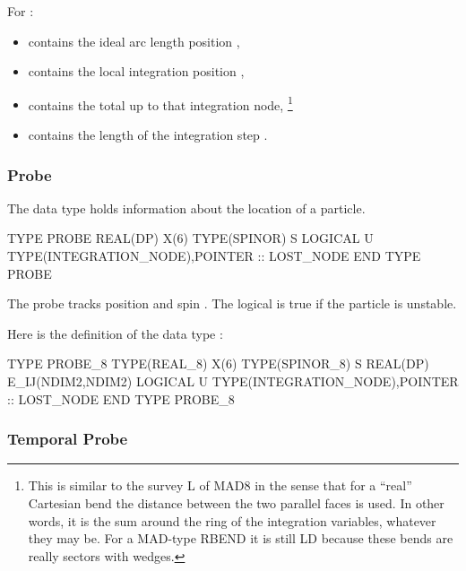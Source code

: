 For :
\begin{itemize}
  \item {} contains the ideal arc length position ,
  \item {} contains the local integration position ,
  \item {} contains the total  up to that integration node,%
  \footnote{This is similar to the survey L of MAD8 in the sense that for a
``real'' Cartesian bend the distance between the two parallel faces is used.
In other words, it is the sum around the ring of the integration variables,
whatever they may be. For a MAD-type RBEND it is still LD because these
bends are really sectors with wedges.}
  \item {} contains the length of the integration step 
  .
\end{itemize}


\subsubsection{Probe}
\label{sub:Probe-B}

The data type  holds information about the location of a particle.

\begin{ptccode}
TYPE PROBE
  REAL(DP) X(6)
  TYPE(SPINOR) S
  LOGICAL U
  TYPE(INTEGRATION_NODE),POINTER :: LOST_NODE
END TYPE PROBE
\end{ptccode}

The probe tracks position  and spin . The logical  is true if the particle is unstable.

Here is the definition of the data type :

\begin{ptccode}
TYPE PROBE_8
  TYPE(REAL_8) X(6)
  TYPE(SPINOR_8) S
  REAL(DP) E_IJ(NDIM2,NDIM2)
  LOGICAL U
  TYPE(INTEGRATION_NODE),POINTER :: LOST_NODE
END TYPE PROBE_8
\end{ptccode}



\subsubsection{Temporal Probe}
\label{sub:Temporal-Probe-B}

